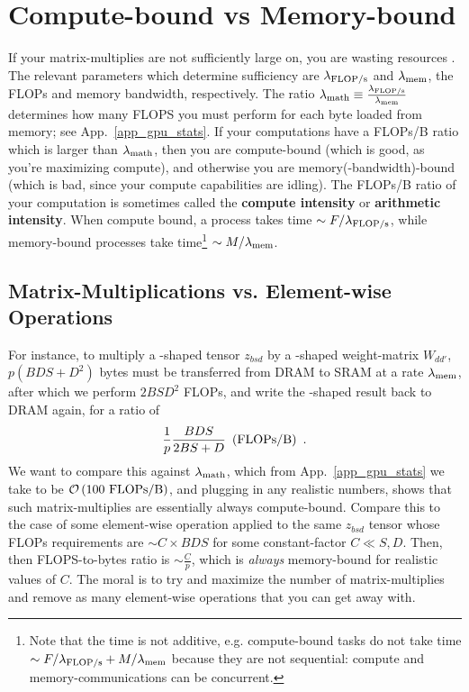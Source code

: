 \documentclass[11pt]{article}
\begin{document}
\section{Compute-bound vs Memory-bound \label{app_compute_mem_bound} }

If your matrix-multiplies are not sufficiently large on, you are wasting resources
\cite{he2022brrrrfromfirstprinciples}. The relevant parameters which determine sufficiency are $
	\lambda _{ {\rm FLOP/s}  } $ and $ \lambda _{ {\rm mem}  } $, the FLOPs and memory bandwidth,
respectively. The ratio $  \lambda _{ {\rm math}  } \equiv \frac{  \lambda _{ {\rm FLOP/s}  } }{
		\lambda _{ {\rm mem}  } }   $ determines how many FLOPS you must perform for each byte loaded from
memory; see App.~\ref{app_gpu_stats}. If your computations have a FLOPs/B ratio which is larger than
$ \lambda _{ {\rm math}  } $, then you are compute-bound (which is good, as you're maximizing
compute), and otherwise you are memory(-bandwidth)-bound (which is bad, since your compute
capabilities are idling). The FLOPs/B ratio of your computation is sometimes called the
\textbf{compute intensity} or \textbf{arithmetic intensity}. When compute bound, a process takes
time $ \sim F/\lambda _{ {\rm FLOP/s} } $, while memory-bound processes take time\footnote{Note that
	the time is not additive, e.g. compute-bound tasks do not take time $ \sim F/\lambda _{ {\rm FLOP/s}
		} +M/\lambda _{ {\rm mem} }$ because they are not sequential: compute and memory-communications can
	be concurrent.} $ \sim M/\lambda _{ {\rm mem} } $.



\subsection{Matrix-Multiplications vs. Element-wise Operations}

For instance, to multiply a -shaped tensor $ z _{ bsd } $ by a -shaped
weight-matrix $ W _{ d d' } $, $ p \left ( BDS +D ^{ 2 } \right ) $ bytes must be transferred from
DRAM to SRAM at a rate $ \lambda _{ {\rm  mem}  } $, after which we perform $ 2BSD ^{ 2 } $ FLOPs,
and write the -shaped  result back to DRAM again, for a ratio of
\begin{align}
	\frac{ 1 }{ p } \frac{ BDS }{ 2BS + D } \ \left ( {\rm FLOPs/B} \right )  \ .
\end{align}
We want to compare this against $ \lambda _{ {\rm math}  } $, which from
App.~\ref{app_gpu_stats} we take to be $ \mathcal{O} \left( 100\  {\rm FLOPs/B} \right)  $, and plugging
in any realistic numbers, shows that such matrix-multiplies are essentially always compute-bound.
Compare this to the case of some element-wise operation applied to the same $ z _{ bsd } $ tensor
whose FLOPs requirements are $ \sim C\times BDS $ for some constant-factor $ C \ll S, D $.  Then,
then FLOPS-to-bytes ratio is $ \sim \frac{ C }{ p } $, which is \textit{always} memory-bound for
realistic values of $ C $. The moral is to try and maximize the number of matrix-multiplies and
remove as many element-wise operations that you can get away with.
\end{document}
